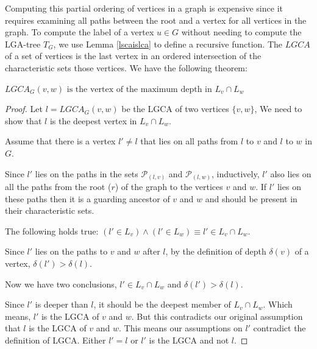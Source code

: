 Computing this partial ordering of vertices in a graph is expensive since it requires examining all paths between the root and a vertex for all vertices in the graph. To compute the label of a vertex $u \in G$ without needing to compute the LGA-tree $T_G$, we use Lemma \ref{lscaislca} to define a recursive function. 
The $LGCA$ of a set of vertices is the last vertex in an ordered intersection of the characteristic sets those vertices. We have the following theorem:

\begin{theorem} \label{proofOfDeepness}
	$\mathit{LGCA}_G(v,w) \text{ is the vertex of the maximum depth in } L_v\cap L_w$
\end{theorem}

\begin{proof}
	 Let $l = LGCA_G(v,w)$ be the LGCA of two vertices $\{v, w\}$, We need to show that $l$ is the deepest vertex in  $L_v \cap L_w$.

	Assume that there is a vertex $l' \neq l$ that lies on all paths from $l$ to $v$ and $l$ to $w$ in $G$.

	Since $l'$ lies on the paths in the sets $\mathcal{P}_{(l,v)}$ and $\mathcal{P}_{(l,w)}$, inductively, $l'$ also lies on all the paths from the root ($r$) of the graph to the vertices $v$ and $w$.
	If  $l'$ lies on these paths then it is a guarding ancestor of $v$ and $w$ and should be present in their characteristic sets.
	
	The following holds true: $(l' \in L_v) \land (l' \in L_w) \equiv l' \in L_v \cap L_w$.

	Since $l'$ lies on the paths to $v$ and $w$ after $l$, by the definition of depth $\delta(v)$ of a vertex,	$\delta(l') > \delta(l)$.

	Now we have two conclusions, $l' \in L_v \cap L_w$ and $\delta(l') > \delta(l)$.

	Since $l'$ is deeper than $l$, it should be the deepest member of  $ L_v \cap L_w$.
	Which means, $l'$ is the LGCA of $v$ and $w$.
	But this contradicts our original assumption that $l$ is the LGCA of $v$ and $w$.
	This means our assumptions on $l'$ contradict the definition of LGCA. Either $l'=l$ or $l'$ is the LGCA and not $l$.
\end{proof}


